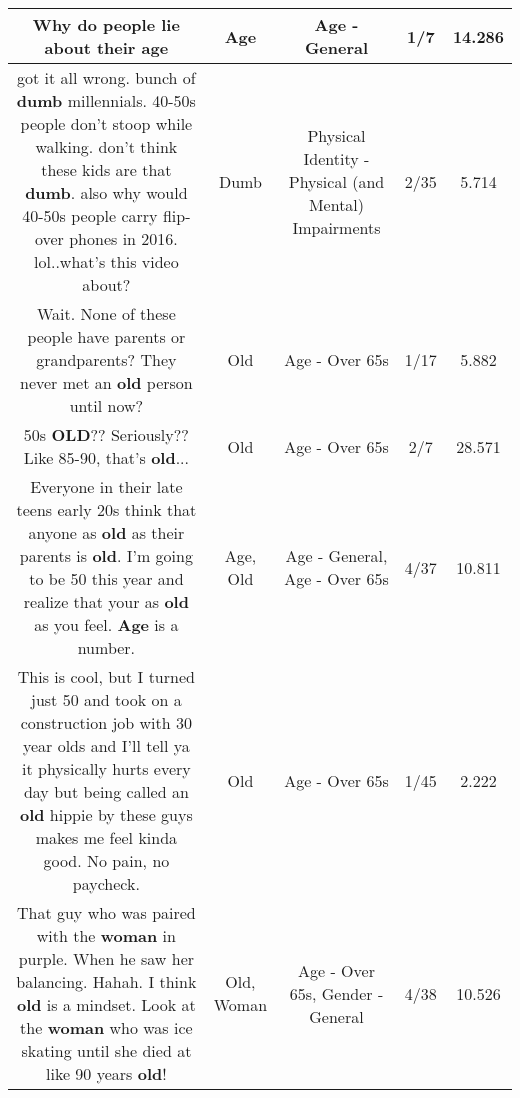 \documentclass[11pt]{article}
\newlength\mylength
\begin{document}
\begin{center}
\begin{longtable}{|C{.65\mylength}|C{.30\mylength}|C{.12\mylength}|C{.12\mylength}|C{.12\mylength}|}
  \small Why do people lie about their age\normalsize   & Age & Age - General & 1/7 & 14.286 \\  \hline
  \small got it all wrong. bunch of \textbf{dumb} millennials. 40-50s people don't stoop while walking. don't think these kids are that \textbf{dumb}. also why would 40-50s people carry flip-over phones in 2016. lol..what's this video about?\normalsize   & Dumb & Physical Identity - Physical (and Mental) Impairments & 2/35 & 5.714 \\  \hline
  \small Wait. None of these people have parents or grandparents? They never met an \textbf{old} person until now?\normalsize   & Old & Age - Over 65s & 1/17 & 5.882 \\  \hline
  \small 50s \textbf{OLD}?? Seriously?? Like 85-90, that's \textbf{old}...\normalsize   & Old & Age - Over 65s & 2/7 & 28.571 \\  \hline
  \small Everyone in their late teens early 20s think that anyone as \textbf{old} as their parents is \textbf{old}.  I'm going to be 50 this year and realize that your as \textbf{old} as you feel. \textbf{Age} is a number.\normalsize   & Age, Old & Age - General, Age - Over 65s & 4/37 & 10.811 \\  \hline
  \small This is cool, but I turned just 50 and took on a construction job with 30 year olds and I'll tell ya it physically hurts every day but being called an \textbf{old} hippie by these guys makes me feel kinda good. No pain, no paycheck.\normalsize   & Old & Age - Over 65s & 1/45 & 2.222 \\  \hline
  \small That guy who was paired with the \textbf{woman} in purple. When he saw her balancing. Hahah. I think \textbf{old} is a mindset.  Look at the \textbf{woman} who was ice skating until she died at like 90 years \textbf{old}!\normalsize   & Old, Woman & Age - Over 65s, Gender - General & 4/38 & 10.526 \\  \hline

\end{longtable}
\end{center}
\end{document}

